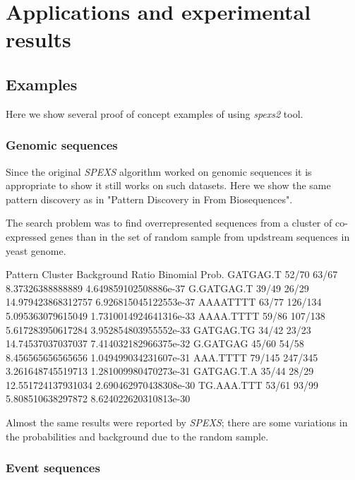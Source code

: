 \chapter{Applications and experimental results}
\label{c:results}

\section{Examples}

Here we show several proof of concept examples of using \emph{spexs2} tool.

\subsection{Genomic sequences}

Since the original \emph{SPEXS} algorithm worked on genomic sequences it is appropriate to show it still works on such datasets. Here we show the same pattern discovery as in "Pattern Discovery in From Biosequences"\cite{spexs}.

The search problem was to find overrepresented sequences from a cluster of co-expressed genes than in the set of random sample from updstream sequences in yeast genome.

\begin{file}
Pattern       Cluster    Background   Ratio                  Binomial Prob.
GATGAG.T      52/70      63/67        8.37326388888889       4.649859102508886e-37
G.GATGAG.T    39/49      26/29        14.979423868312757     6.926815045122553e-37
AAAATTTT      63/77      126/134      5.095363079615049      1.7310014924641316e-33
AAAA.TTTT     59/86      107/138      5.617283950617284      3.952854803955552e-33
GATGAG.TG     34/42      23/23        14.74537037037037      7.414032182966375e-32
G.GATGAG      45/60      54/58        8.456565656565656      1.049499034231607e-31
AAA.TTTT      79/145     247/345      3.261648745519713      1.281009980470273e-31
GATGAG.T.A    35/44      28/29        12.551724137931034     2.690462970438308e-30
TG.AAA.TTT    53/61      93/99        5.808510638297872      8.624022620310813e-30
\end{file}

Almost the same results were reported by \emph{SPEXS}; there are some variations in the probabilities and background due to the random sample.

\subsection{Event sequences}

